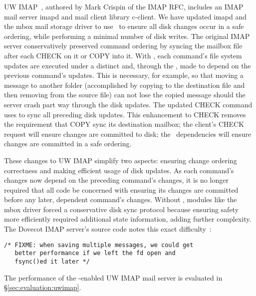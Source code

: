 UW IMAP~\cite{uwimap}, authored by Mark Crispin of the IMAP RFC,
includes an IMAP mail server imapd and mail client library c-client.
We have updated imapd and the mbox mail storage driver to use
\opgroups\ to ensure all disk changes occur in a safe ordering, while
performing a minimal number of disk writes.
%
The original IMAP server conservatively preserved command ordering by
syncing the mailbox file after each CHECK on it or COPY into it. With
\opgroups, each command's file system updates are executed under a
distinct \opgroup and, through the \opgroup, made to depend on the
previous command's updates. This is necessary, for example, so that
moving a message to another folder (accomplished by copying to the
destination file and then removing from the source file) can not lose
the copied message should the server crash part way through the disk
updates.
%
The updated CHECK command uses \opgroupSync to sync all preceding disk
updates. This enhancement to CHECK removes the requirement that COPY
sync its destination mailbox; the client's CHECK request will ensure
changes are committed to disk; the \opgroup\ dependencies will ensure
changes are committed in a safe ordering.

These changes to UW IMAP simplify two aspects:
%
ensuring change ordering correctness
%
and making efficient usage of disk updates.
%
As each command's changes now depend on the preceding command's
changes, it is no longer required that all code be concerned with
ensuring its changes are committed before any later, dependent
command's changes. Without \opgroups, modules like the mbox driver
forced a conservative disk sync protocol because ensuring safety more
efficiently required additional state information, adding further
complexity. The Dovecot IMAP server's source code notes this exact
difficulty~\cite[maildir-save.c]{dovecot}:

\vspace{-0.5\baselineskip}
\begin{scriptsize}
\begin{verbatim}
/* FIXME: when saving multiple messages, we could get
   better performance if we left the fd open and
   fsync()ed it later */
\end{verbatim}
\end{scriptsize}
\vspace{-0.5\baselineskip}

The performance of the \opgroup{}-enabled UW IMAP mail server is
evaluated in \S\ref{sec:evaluation:uwimap}.

